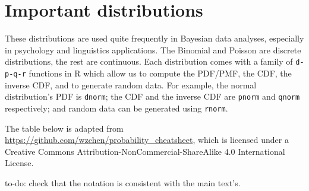 \documentclass[12pt,]{krantz}
\begin{document}
\hypertarget{important-distributions}{%
\chapter{Important distributions}\label{important-distributions}}

These distributions are used quite frequently in Bayesian data analyses, especially in psychology and linguistics applications. The Binomial and Poisson are discrete distributions, the rest are continuous. Each distribution comes with a family of \texttt{d-p-q-r} functions in R which allow us to compute the PDF/PMF, the CDF, the inverse CDF, and to generate random data. For example, the normal distribution's PDF is \texttt{dnorm}; the CDF and the inverse CDF are \texttt{pnorm} and \texttt{qnorm} respectively; and random data can be generated using \texttt{rnorm}.

The table below is adapted from \url{https://github.com/wzchen/probability_cheatsheet}, which is licensed under a Creative Commons Attribution-NonCommercial-ShareAlike 4.0 International License.

to-do: check that the notation is consistent with the main text's.
\end{document}
